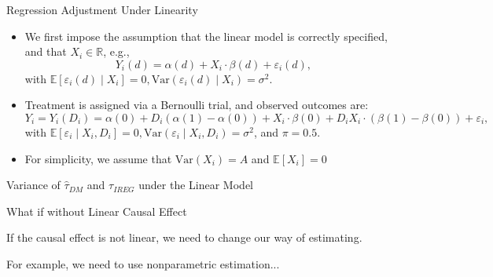 \documentclass[11pt,aspectratio=169]{beamer}
\begin{document}
\begin{frame}{Regression Adjustment Under Linearity}
\begin{itemize}
    \item We first impose the assumption that the linear model is correctly specified, and that $X_i \in \mathbb{R}$, e.g.,
    $$Y_i(d) = \alpha(d) + X_i \cdot \beta(d) + \varepsilon_i(d),$$
    with $\mathbb{E}[\varepsilon_i(d) \mid X_i] = 0, \text{Var}(\varepsilon_i(d) \mid X_i) = \sigma^2$.
    \item Treatment is assigned via a Bernoulli trial, and observed outcomes are:
    $$Y_i = Y_i(D_i) = \alpha(0) + D_i(\alpha(1) - \alpha(0)) + X_i \cdot \beta(0) + D_i X_i \cdot (\beta(1) - \beta(0)) + \varepsilon_i,$$
    with $\mathbb{E}[\varepsilon_i \mid X_i, D_i] = 0, \text{Var}(\varepsilon_i \mid X_i, D_i) = \sigma^2$, and $\pi = 0.5$.
    \item For simplicity, we assume that $\text{Var}(X_i) = A$ and $\mathbb{E}[X_i] = 0$
\end{itemize}

\end{frame}
\begin{frame}{Variance of $\hat{\tau}_{DM}$ and $\tau_{IREG}$ under the Linear Model}





\end{frame}


\begin{frame}{What if without Linear Causal Effect}

If the causal effect is not linear, we need to change our way of estimating.

For example, we need to use nonparametric estimation...

\end{frame}
\end{document}
